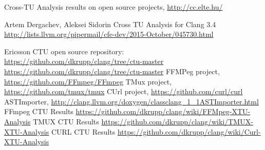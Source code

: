 \documentclass{article}
\begin{document}
\begin{thebibliography}{9}
 Cross-TU Analysis results on open source projects, \url{http://cc.elte.hu/}

 Artem Dergachev, Aleksei Sidorin Cross TU Analysis for Clang 
3.4 \url{http://lists.llvm.org/pipermail/cfe-dev/2015-October/045730.html}

 Ericsson CTU open source repository: \url{https://github.com/dkrupp/clang/tree/ctu-master}
 \url{https://github.com/dkrupp/clang/tree/ctu-master}
 FFMPeg project,  \url{https://github.com/FFmpeg/FFmpeg}
 TMux project, \url{https://github.com/tmux/tmux}
 CUrl project, \url{https://github.com/curl/curl}
 ASTImporter, \url{http://clang.llvm.org/doxygen/classclang_1_1ASTImporter.html}
 FFmpeg CTU Results {\small \url{https://github.com/dkrupp/clang/wiki/FFMpeg-XTU-Analysis}}
 TMUX CTU Results \url{https://github.com/dkrupp/clang/wiki/TMUX-XTU-Analysis}
 CURL CTU Results \url{https://github.com/dkrupp/clang/wiki/Curl-XTU-Analysis}
\end{thebibliography}
\end{document}
